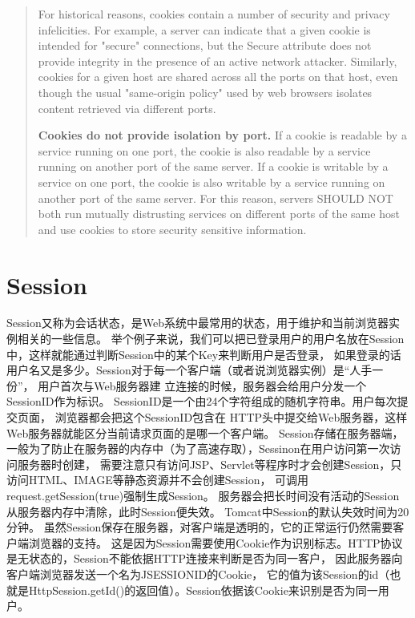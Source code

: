 \documentclass{book}
\begin{document}
\begin{quotation}
For historical reasons, cookies contain a number of security and privacy infelicities. 
For example, a server can indicate that a given cookie is intended for "secure" connections, 
but the Secure attribute does not provide integrity in the presence of an active network attacker. Similarly, cookies for a given host are shared across all the ports on that host, 
even though the usual "same-origin policy" used by web browsers isolates content retrieved via different ports.

\textbf{Cookies do not provide isolation by port.} If a cookie is readable by a service running 
on one port, the cookie is also readable by a service running on another port of the same server. If a cookie is writable by a service on one port, the cookie is also writable by a service 
running on another port of the same server. For this reason, 
servers SHOULD NOT both run mutually distrusting services on different ports of 
the same host and use cookies to store security sensitive information.
\end{quotation}


\section{Session}

Session又称为会话状态，是Web系统中最常用的状态，用于维护和当前浏览器实例相关的一些信息。
举个例子来说，我们可以把已登录用户的用户名放在Session中，这样就能通过判断Session中的某个Key来判断用户是否登录，
如果登录的话用户名又是多少。Session对于每一个客户端（或者说浏览器实例）是“人手一份”，
用户首次与Web服务器建 立连接的时候，服务器会给用户分发一个 SessionID作为标识。
SessionID是一个由24个字符组成的随机字符串。用户每次提交页面，
浏览器都会把这个SessionID包含在 HTTP头中提交给Web服务器，这样Web服务器就能区分当前请求页面的是哪一个客户端。
Session存储在服务器端，一般为了防止在服务器的内存中（为了高速存取），Sessinon在用户访问第一次访问服务器时创建，
需要注意只有访问JSP、Servlet等程序时才会创建Session，只访问HTML、IMAGE等静态资源并不会创建Session，
可调用request.getSession(true)强制生成Session。
服务器会把长时间没有活动的Session从服务器内存中清除，此时Session便失效。
Tomcat中Session的默认失效时间为20分钟。
虽然Session保存在服务器，对客户端是透明的，它的正常运行仍然需要客户端浏览器的支持。
这是因为Session需要使用Cookie作为识别标志。HTTP协议是无状态的，Session不能依据HTTP连接来判断是否为同一客户，
因此服务器向客户端浏览器发送一个名为JSESSIONID的Cookie，
它的值为该Session的id（也就是HttpSession.getId()的返回值）。Session依据该Cookie来识别是否为同一用户。
\end{document}
